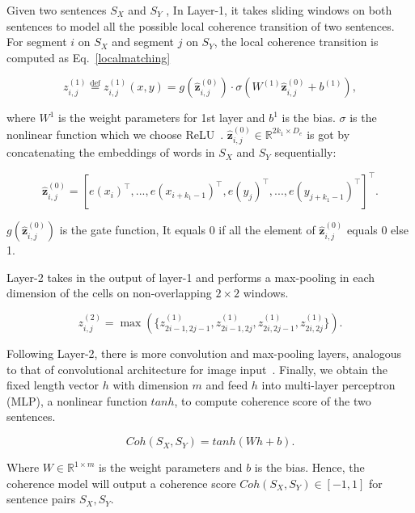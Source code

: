 \documentclass[letterpaper]{article} %
\begin{document}
	
	Given two sentences $S_X$ and $S_Y$ , In Layer-1, it takes sliding windows on both sentences to model all the possible local coherence transition of two sentences. For segment $i$ on $S_X$ and segment $j$ on $S_Y$, the local coherence transition is computed as Eq.~\ref{localmatching}
	
	\begin{equation}
	z^{(1)}_{i,j} \overset{\text{def}}{=}
	z^{(1)}_{i,j}(x,y) =  g(\hat{\mathbf{z}}^{(0)}_{i,j})\cdot \sigma(W^{(1)} \hat{\mathbf{z}}^{(0)}_{i,j} + b^{(1)}),
	\label{localmatching}
	\end{equation}
	
	where $W^1$ is the weight parameters for 1st layer and $b^1$ is the bias. $\sigma$ is the nonlinear function which we choose ReLU~\cite{relu}. $\hat{\mathbf{z}}^{(0)}_{i,j} \in \mathbb{R}^{2k_1 \times D_{e}}$ is got by concatenating the embeddings of words in $S_X$ and $S_Y$ sequentially:
	
	\begin{equation}
	\hat{\mathbf{z}}^{(0)}_{i,j} =  [e(x_i)^\top, ... , e(x_{i+k_1-1})^\top, e(y_j)^\top,..., e(y_{j+k_1-1})^\top]^\top.
	\end{equation}
	
	\noindent $g(\hat{\mathbf{z}}^{(0)}_{i,j})$ is the gate function, It equals 0 if all the element of $\hat{\mathbf{z}}^{(0)}_{i,j}$ equals 0 else 1.
	
	Layer-2 takes in the output of layer-1 and performs a max-pooling in each dimension of the cells on non-overlapping $2\times 2$ windows.
	
	
	\begin{equation}
	z_{i,j}^{(2)} = \max(\{z_{2i-1,2j-1}^{(1)}, z_{2i-1,2j}^{(1)},z_{2i,2j-1}^{(1)},z_{2i,2j}^{(1)}\}). 
	\end{equation}
	
	Following Layer-2, there is more convolution and  max-pooling layers, analogous to that of convolutional architecture for image input~\cite{cnn}. Finally, we obtain the fixed length vector $h$ with dimension $m$ and feed $h$ into multi-layer perceptron (MLP), a nonlinear function $tanh$, to compute coherence score of the two sentences.
	
	\begin{equation}
	Coh(S_X,S_Y) = tanh(W  h+b). 
	\end{equation}
	
	\noindent Where  $ W \in \mathbb{R}^{1 \times m}$ is the weight parameters and $b$ is the bias. Hence, the coherence model will output a coherence score  $Coh(S_X, S_Y) \in [-1,1]$ for sentence pairs $S_X, S_Y$.
	
\end{document}
